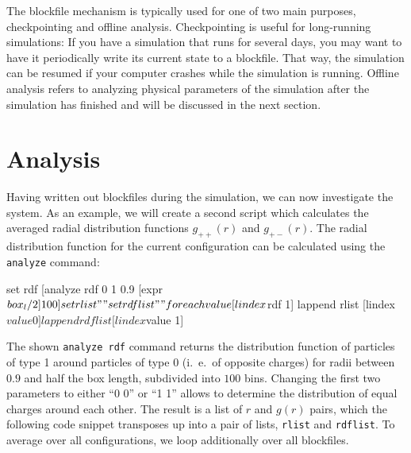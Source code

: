\documentclass[
a4paper,                        %
11pt,                           %
twoside,                        %
footsepline,                    %
headsepline,                    %
headexclude,                    %
footexclude,                    %
pagesize,                       %
]{scrartcl}
\begin{document}
The blockfile mechanism is typically used for one of two main
purposes, checkpointing and offline analysis.
Checkpointing is useful for long-running simulations: If you have
a simulation that runs for several days, you may want to have it
periodically write its current state to a blockfile. That way, the
simulation can be resumed if your computer crashes while the
simulation is running.
Offline analysis refers to analyzing physical parameters of the
simulation after the simulation has finished and will be discussed in
the next section.

\section{Analysis}

Having written out blockfiles during the simulation, we can now
investigate the system. As an
example, we will create a second script which calculates the averaged
radial distribution functions $g_{++}(r)$ and $g_{+-}(r)$. The radial
distribution function for the current configuration can be calculated
using the \verb|analyze| command:

\begin{tclcode}
  set rdf [analyze rdf 0 1 0.9 [expr $box_l/2] 100]
  set rlist ""
  set rdflist ""
  foreach value [lindex $rdf 1] {
    lappend rlist [lindex $value 0]
    lappend rdflist [lindex $value 1]
  }
\end{tclcode}

The shown \verb|analyze rdf| command returns the distribution function
of particles of type 1 around particles of type 0 (i.~e.\ of opposite
charges) for radii between $0.9$ and half the box length, subdivided
into $100$ bins.  Changing the first two parameters to either ``0 0''
or ``1 1'' allows to determine the distribution of equal charges
around each other. The
result is a list of $r$ and $g(r)$ pairs, which the following code
snippet transposes up into a pair of lists, \verb|rlist| and
\verb|rdflist|.
To average over all configurations, we loop additionally over all
blockfiles.

\end{document}
